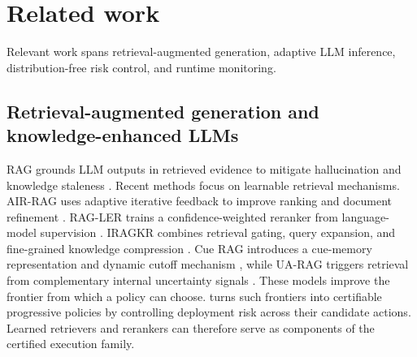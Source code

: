 \section{Related work}
\label{sec:related}

Relevant work spans retrieval-augmented generation, adaptive LLM
inference, distribution-free risk control, and runtime monitoring.

\subsection{Retrieval-augmented generation and knowledge-enhanced LLMs}
RAG grounds LLM outputs in retrieved evidence to mitigate hallucination
and knowledge staleness \citep{lewis2020rag,gao2024ragsurvey,
yang2025integrating}. Recent methods focus on learnable retrieval
mechanisms. AIR-RAG uses adaptive iterative feedback to improve ranking
and document refinement \citep{han2026airrag}. RAG-LER trains a
confidence-weighted reranker from language-model supervision
\citep{zhai2025ragler}. IRAGKR combines retrieval gating, query
expansion, and fine-grained knowledge compression
\citep{du2025iragkr}. Cue RAG introduces a cue-memory representation
and dynamic cutoff mechanism \citep{fu2025cuerag}, while UA-RAG triggers
retrieval from complementary internal uncertainty signals
\citep{niu2026uarag}. These models improve the frontier from which a
policy can choose. \system turns such frontiers into certifiable
progressive policies by controlling deployment risk across their
candidate actions. Learned retrievers and rerankers can therefore serve
as components of the certified execution family.

